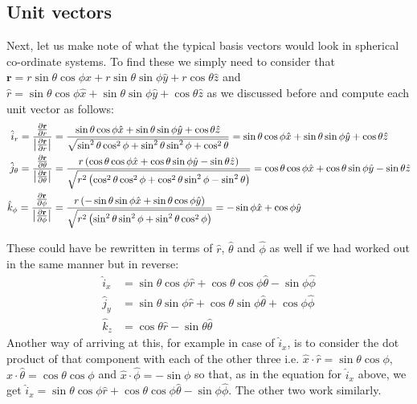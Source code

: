 \documentclass[english,seminar]{lecture}
\begin{document}
\subsection{Unit vectors}
Next, let us make note of what the typical basis vectors would look in spherical co-ordinate systems. To find these we simply need to consider that $\mathbf{r} = r\sin\theta\cos\phi\hat{x} + r\sin\theta\sin\phi\hat{y} + r\cos\theta\hat{z}$ and $\hat{r} = \sin\theta\cos\phi\hat{x} + \sin\theta\sin\phi\hat{y} + \cos\theta\hat{z}$ as we discussed before and compute each unit vector as follows:
\begin{align*}
\hat{i}_r = {{ \partial \mathbf{r} \over \partial r }\over \bigr|{ \partial \mathbf{r} \over \partial r }\bigr|} &= {\sin\theta\cos\phi\hat{x} + \sin\theta\sin\phi\hat{y} + \cos\theta\hat{z} \over \sqrt{\sin^2\theta\cos^2\phi + \sin^2\theta\sin^2\phi + \cos^2\theta}} = \sin\theta\cos\phi\hat{x} + \sin\theta\sin\phi\hat{y} + \cos\theta\hat{z} \\
\hat{j}_\theta = {{ \partial \mathbf{r} \over \partial \theta }\over \bigr|{ \partial \mathbf{r} \over \partial \theta }\bigr|} &= {r\left(\cos\theta\cos\phi\hat{x} + \cos\theta\sin\phi\hat{y} - \sin\theta\hat{z}\right) \over \sqrt{r^2\left(\cos^2\theta\cos^2\phi + \cos^2\theta\sin^2\phi - \sin^2\theta\right)}} = \cos\theta\cos\phi\hat{x} + \cos\theta\sin\phi\hat{y} - \sin\theta\hat{z}\\
\hat{k}_\phi = {{ \partial \mathbf{r} \over \partial \phi }\over \bigr|{ \partial \mathbf{r} \over \partial \phi }\bigr|} &= {r\left(-\sin\theta\sin\phi\hat{x} + \sin\theta\cos\phi\hat{y} \right) \over \sqrt{r^2\left(\sin^2\theta\sin^2\phi + \sin^2\theta\cos^2\phi\right)}} =  -\sin\phi\hat{x} + \cos\phi\hat{y}
\end{align*}

These could have be rewritten in terms of $\hat{r}$, $\hat{\theta}$ and $\hat{\phi}$ as well if we had worked out in the same manner but in reverse:
\begin{align*}
\hat{i}_x &= \sin\theta\cos\phi\hat{r} + \cos\theta\cos\phi\hat{\theta} - \sin\phi\hat{\phi} \\
\hat{j}_y &= \sin\theta\sin\phi\hat{r} + \cos\theta\sin\phi\hat{\theta} + \cos\phi\hat{\phi} \\
\hat{k}_z &= \cos\theta\hat{r} - \sin\theta\hat{\theta}
\end{align*}
Another way of arriving at this, for example in case of $\hat{i}_x$, is to consider the dot product of that component with each of the other three i.e. $\hat{x}\cdot\hat{r} = \sin\theta\cos\phi$, $\hat{x}\cdot\hat{\theta} = \cos\theta\cos\phi$ and $\hat{x}\cdot\hat{\phi} = -\sin\phi$ so that, as in the equation for $\hat{i}_x$ above, we get $\hat{i}_x = \sin\theta\cos\phi\hat{r} + \cos\theta\cos\phi\hat{\theta} - \sin\phi\hat{\phi}$. The other two work similarly.
\end{document}
